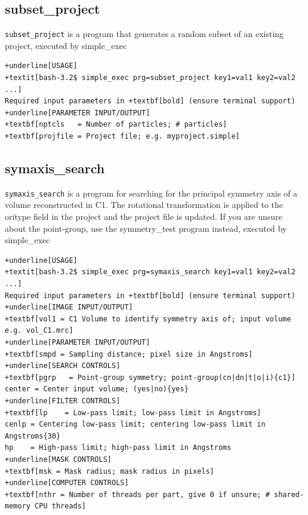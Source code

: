 \documentclass[a4paper,11pt]{article}
\newcommand{\prgname}[1]{\textcolor{NavyBlue}{\texttt{#1}}}
\begin{document}
\subsection{subset\_project}
\label{subset_project}
\prgname{subset\_project} is a program that generates a random subset of an existing project, executed by simple\_exec
\begin{Verbatim}[commandchars=+\[\],fontsize=\small,breaklines=true]
+underline[USAGE]
+textit[bash-3.2$ simple_exec prg=subset_project key1=val1 key2=val2 ...]
Required input parameters in +textbf[bold] (ensure terminal support)
+underline[PARAMETER INPUT/OUTPUT]
+textbf[nptcls   = Number of particles; # particles]
+textbf[projfile = Project file; e.g. myproject.simple]
\end{Verbatim}

\subsection{symaxis\_search}
\label{symaxis_search}
\prgname{symaxis\_search} is a program for searching for the principal symmetry axis of a volume reconstructed in C1. The rotational transformation is applied to the oritype field in the project and the project file is updated. If you are unsure about the point-group, use the symmetry\_test program instead, executed by simple\_exec
\begin{Verbatim}[commandchars=+\[\],fontsize=\small,breaklines=true]
+underline[USAGE]
+textit[bash-3.2$ simple_exec prg=symaxis_search key1=val1 key2=val2 ...]
Required input parameters in +textbf[bold] (ensure terminal support)
+underline[IMAGE INPUT/OUTPUT]
+textbf[vol1 = C1 Volume to identify symmetry axis of; input volume e.g. vol_C1.mrc]
+underline[PARAMETER INPUT/OUTPUT]
+textbf[smpd = Sampling distance; pixel size in Angstroms]
+underline[SEARCH CONTROLS]
+textbf[pgrp   = Point-group symmetry; point-group(cn|dn|t|o|i){c1}]
center = Center input volume; (yes|no){yes}
+underline[FILTER CONTROLS]
+textbf[lp    = Low-pass limit; low-pass limit in Angstroms]
cenlp = Centering low-pass limit; centering low-pass limit in Angstroms{30}
hp    = High-pass limit; high-pass limit in Angstroms
+underline[MASK CONTROLS]
+textbf[msk = Mask radius; mask radius in pixels]
+underline[COMPUTER CONTROLS]
+textbf[nthr = Number of threads per part, give 0 if unsure; # shared-memory CPU threads]
\end{Verbatim}
\end{document}
